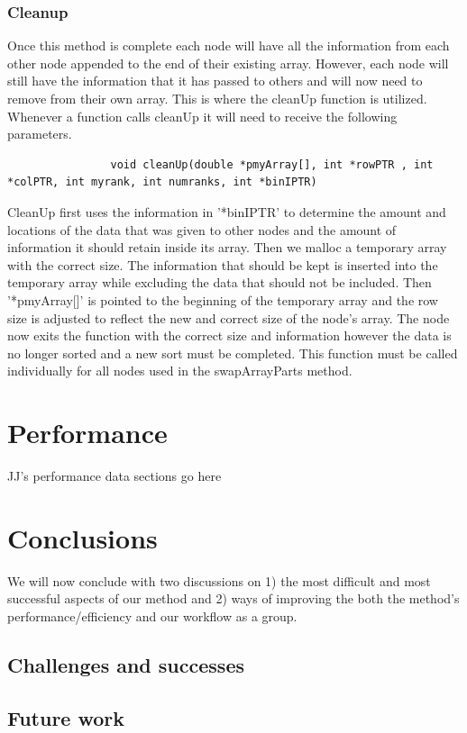 \documentclass{article}
\begin{document}
\subsubsection{Cleanup}
Once this method is complete each node will have all the information from each other node appended to the end of their existing array. However, each node will still have the information that it has passed to others and will now need to remove from their own array. This is where the cleanUp function is utilized. Whenever a function calls cleanUp it will need to receive the following parameters.
\begin{lstlisting}
                void cleanUp(double *pmyArray[], int *rowPTR , int *colPTR, int myrank, int numranks, int *binIPTR)
\end{lstlisting}
CleanUp first uses the information in '*binIPTR' to determine the amount and locations of the data that was given to other nodes and the amount of information it should retain inside its array. Then we malloc a temporary array with the correct size. The information that should be kept is inserted into the temporary array while excluding the data that should not be included. Then '*pmyArray[]' is pointed to the beginning of the temporary array and the row size is adjusted to reflect the new and correct size of the node's array. The node now exits the function with the correct size and information however the data is no longer sorted and a new sort must be completed. This function must be called individually for all nodes used in the swapArrayParts method. 


\section{Performance}

JJ's performance data sections go here



\section{Conclusions}
We will now conclude with two discussions on 1) the most difficult and most successful aspects of our method and 2) ways of improving the both the method's performance/efficiency and our workflow as a group.

\subsection{Challenges and successes}


\subsection{Future work}



\end{document}

